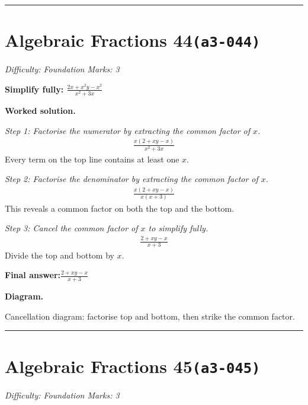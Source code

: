 \documentclass[11pt]{article}
\newcommand{\question}[1]{\par\medskip\noindent\textbf{#1}\par}
\begin{document}
\medskip\hrule

\section*{Algebraic Fractions 44\quad\small\texttt{(a3-044)}}
\textit{Difficulty: Foundation \quad\textbar\quad Marks: 3}

\question{Simplify fully: \( \frac{2x + x^2y - x^2}{x^2 + 3x} \)}

\textbf{Worked solution.}

\textit{Step 1: Factorise the numerator by extracting the common factor of \( x \).}
\[\begin{gathered}
\frac{x(2 + xy - x)}{x^2 + 3x}
\end{gathered}\]
Every term on the top line contains at least one \( x \).

\textit{Step 2: Factorise the denominator by extracting the common factor of \( x \).}
\[\begin{gathered}
\frac{x(2 + xy - x)}{x(x + 3)}
\end{gathered}\]
This reveals a common factor on both the top and the bottom.

\textit{Step 3: Cancel the common factor of \( x \) to simplify fully.}
\[\begin{gathered}
\frac{2 + xy - x}{x + 3}
\end{gathered}\]
Divide the top and bottom by \( x \).

\begin{answerbox}
\textbf{Final answer:}\quad \(\displaystyle \frac{2 + xy - x}{x + 3}\)
\end{answerbox}
\textbf{Diagram.}

\begin{center}
\end{center}
\small Cancellation diagram: factorise top and bottom, then strike the common factor.\normalsize

\medskip\hrule

\section*{Algebraic Fractions 45\quad\small\texttt{(a3-045)}}
\textit{Difficulty: Foundation \quad\textbar\quad Marks: 3}
\end{document}
